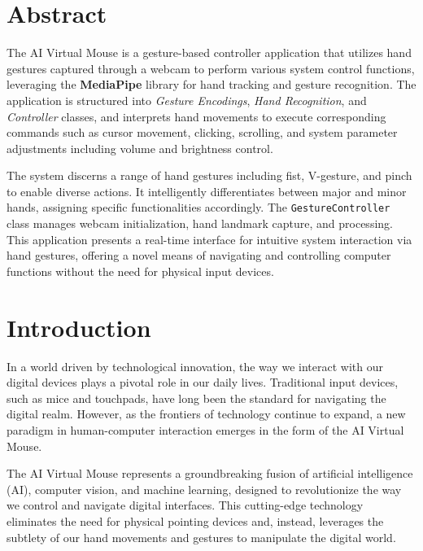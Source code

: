 \documentclass[12pt,a4paper]{report}
\begin{document}
\chapter*{Abstract}

The AI Virtual Mouse is a gesture-based controller application that utilizes hand gestures
captured through a webcam to perform various system control functions, leveraging the
\textbf{MediaPipe} library for hand tracking and gesture recognition. The application is
structured into \textit{Gesture Encodings}, \textit{Hand Recognition}, and \textit{Controller}
classes, and interprets hand movements to execute corresponding commands such as cursor
movement, clicking, scrolling, and system parameter adjustments including volume and
brightness control.

The system discerns a range of hand gestures including fist, V-gesture, and pinch to enable
diverse actions. It intelligently differentiates between major and minor hands, assigning
specific functionalities accordingly. The \texttt{GestureController} class manages webcam
initialization, hand landmark capture, and processing. This application presents a real-time
interface for intuitive system interaction via hand gestures, offering a novel means of
navigating and controlling computer functions without the need for physical input devices.

\newpage  %

\tableofcontents

\chapter{Introduction}

In a world driven by technological innovation, the way we interact with our digital devices
plays a pivotal role in our daily lives. Traditional input devices, such as mice and touchpads,
have long been the standard for navigating the digital realm. However, as the frontiers of
technology continue to expand, a new paradigm in human-computer interaction emerges in the
form of the AI Virtual Mouse.

The AI Virtual Mouse represents a groundbreaking fusion of artificial intelligence (AI),
computer vision, and machine learning, designed to revolutionize the way we control and
navigate digital interfaces. This cutting-edge technology eliminates the need for physical
pointing devices and, instead, leverages the subtlety of our hand movements and gestures to
manipulate the digital world.
\end{document}
